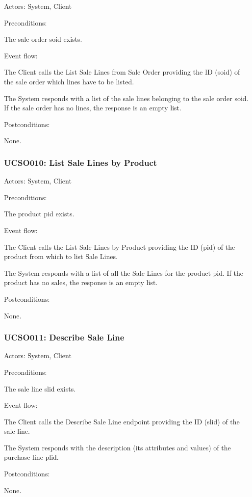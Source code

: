 Actors: System, Client

Preconditions:

\ucitem The sale order soid exists.

Event flow:

\ucitem The Client calls the List Sale Lines from Sale Order providing the ID (soid) of the sale order which lines have to be listed.

\ucitem The System responds with a list of the sale lines belonging to the sale order soid. If the sale order has no lines, the response is an empty list.

Postconditions: 

\ucitem None.

\subsubsection{UCSO010: List Sale Lines by Product}
\label{UCSO010}

Actors: System, Client

Preconditions:

\ucitem The product pid exists.

Event flow:

\ucitem The Client calls the List Sale Lines by Product providing the ID (pid) of the product from which to list Sale Lines.

\ucitem The System responds with a list of all the Sale Lines for the product pid. If the product has no sales, the response is an empty list.

Postconditions:

\ucitem None.

\subsubsection{UCSO011: Describe Sale Line}
\label{UCSO011}

Actors: System, Client

Preconditions:

\ucitem The sale line slid exists.

Event flow:

\ucitem The Client calls the Describe Sale Line endpoint providing the ID (slid) of the sale line.

\ucitem The System responds with the description (its attributes and values) of the purchase line plid.

Postconditions:

\ucitem None.

